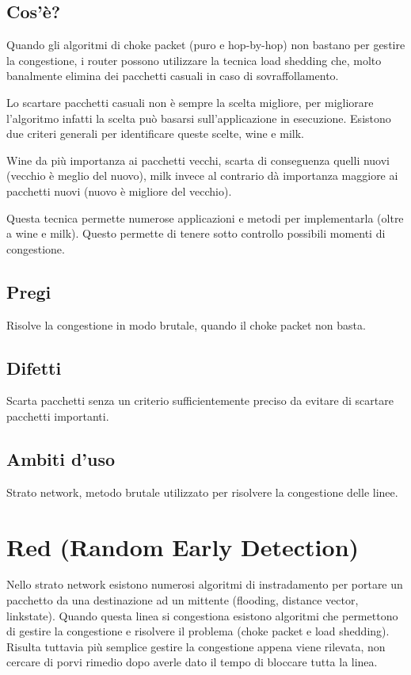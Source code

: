 \subsection{Cos'è?}
Quando gli algoritmi di choke packet (puro e hop-by-hop) non bastano per gestire la congestione, i router possono utilizzare la tecnica load shedding che, molto banalmente elimina dei pacchetti casuali in caso di sovraffollamento.

Lo scartare pacchetti casuali non è sempre la scelta migliore, per migliorare l’algoritmo infatti la scelta può basarsi sull’applicazione in esecuzione. Esistono due criteri generali per identificare queste scelte, wine e milk.

Wine da più importanza ai pacchetti vecchi, scarta di conseguenza quelli nuovi (vecchio è meglio del nuovo), milk invece al contrario dà importanza maggiore ai pacchetti nuovi (nuovo è migliore del vecchio).

Questa tecnica permette numerose applicazioni e metodi per implementarla (oltre a wine e milk). Questo permette di tenere sotto controllo possibili momenti di congestione.

\subsection{Pregi}
Risolve la congestione in modo brutale, quando il choke packet non basta.

\subsection{Difetti}
Scarta pacchetti senza un criterio sufficientemente preciso da evitare di scartare pacchetti importanti.

\subsection{Ambiti d'uso}
Strato network, metodo brutale utilizzato per risolvere la congestione delle linee.

\section{Red (Random Early Detection)}

Nello strato network esistono numerosi algoritmi di instradamento per portare un pacchetto da una destinazione ad un mittente (flooding, distance vector, linkstate). Quando questa linea si congestiona esistono algoritmi che permettono di gestire la congestione e risolvere il problema (choke packet e load shedding). Risulta tuttavia più semplice gestire la congestione appena viene rilevata, non cercare di porvi rimedio dopo averle dato il tempo di bloccare tutta la linea.
